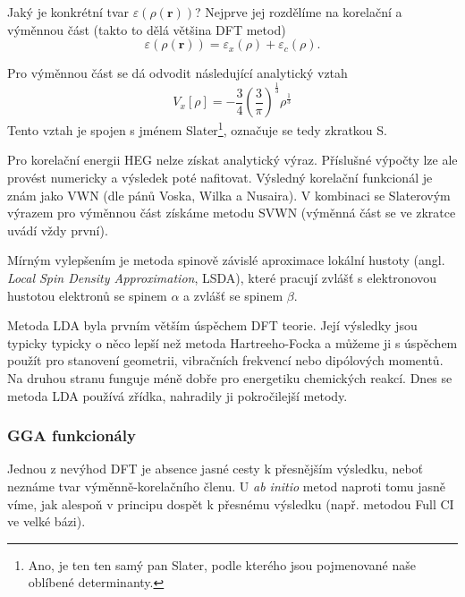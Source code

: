 Jaký je konkrétní tvar $\varepsilon(\rho(\textbf{r}))$? Nejprve jej rozdělíme na korelační a výměnnou část (takto to dělá většina DFT metod)
\begin{equation}
\varepsilon(\rho(\textbf{r}))=\varepsilon_x(\rho)+\varepsilon_c(\rho) .
\end{equation}

\noindent Pro výměnnou část se dá odvodit následující analytický vztah
\begin{equation}
V_x[\rho]=-\frac{3}{4}\left(\frac{3}{\pi}\right)^{\frac{1}{3}}\rho^{\frac{1}{3}}
\end{equation}
Tento vztah je spojen s jménem Slater\footnote{Ano, je ten ten samý pan Slater, podle kterého jsou pojmenované naše oblíbené determinanty.}, označuje se tedy zkratkou S.

Pro korelační energii HEG nelze získat analytický výraz. Příslušné výpočty lze ale provést numericky a výsledek poté nafitovat. Výsledný korelační funkcionál je znám jako VWN (dle pánů Voska, Wilka a Nusaira). V kombinaci se Slaterovým výrazem pro výměnnou část získáme metodu SVWN (výměnná část se ve zkratce uvádí vždy první).

Mírným vylepšením je metoda spinově závislé aproximace lokální hustoty (angl. \textit{Local Spin Density Approximation}, LSDA), které pracují zvlášť s elektronovou hustotou elektronů se spinem $\alpha$ a zvlášť se spinem $\beta$.

Metoda LDA byla prvním větším úspěchem DFT teorie. Její výsledky jsou typicky typicky o něco lepší než metoda Hartreeho-Focka a můžeme ji s úspěchem použít pro stanovení geometrii, vibračních frekvencí nebo dipólových momentů. Na druhou stranu funguje méně dobře pro energetiku chemických reakcí. Dnes se metoda LDA používá zřídka, nahradily ji pokročilejší metody.

\subsubsection{GGA funkcionály}
Jednou z nevýhod DFT je absence jasné cesty k přesnějším výsledku, neboť neznáme tvar výměnně-korelačního členu. U \textit{ab initio} metod naproti tomu jasně víme, jak alespoň v principu dospět k přesnému výsledku (např. metodou Full CI ve velké bázi).

